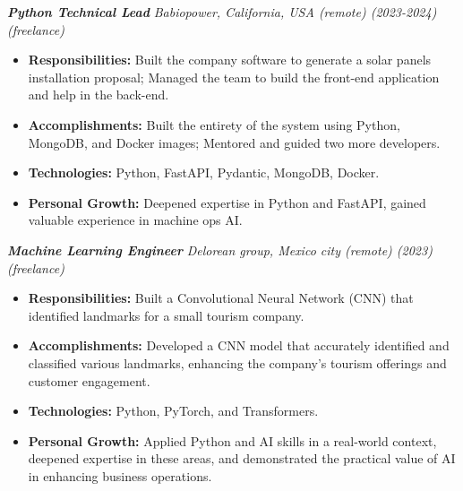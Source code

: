 \documentclass[a4paper,10pt]{article}
\begin{document}
\begin{minipage}[t]{0.65\textwidth}
\begin{minipage}[t]{\dimexpr\linewidth-25px}
    \vspace{0.5cm}

    \textbf{\textit{Python Technical Lead}}
    \textit{\small Babiopower, California, USA (remote) (2023-2024) (freelance)}
    \vspace{0.3cm}
    \begin{itemize}[leftmargin=*]
        \item \textbf{Responsibilities:} Built the company software to generate a solar panels installation proposal;
    Managed the team to build the front-end application and help in the back-end.
        \item \textbf{Accomplishments:} Built the entirety of the system using Python, MongoDB, and Docker images;
    Mentored and guided two more developers.
        \item \textbf{Technologies:} Python, FastAPI, Pydantic, MongoDB, Docker.
        \item \textbf{Personal Growth:} Deepened expertise in Python and FastAPI, gained valuable experience in machine ops AI.
    \end{itemize}

    \vspace{0.5cm}

    \textbf{\textit{Machine Learning Engineer}}
    \textit{\small Delorean group, Mexico city (remote) (2023) (freelance)}
    \vspace{0.3cm}
    \begin{itemize}[leftmargin=*]
        \item \textbf{Responsibilities:} Built a Convolutional Neural Network (CNN) that identified landmarks for a small
    tourism company.
        \item \textbf{Accomplishments:} Developed a CNN model that accurately identified and classified various
    landmarks, enhancing the company's tourism offerings and customer engagement.
        \item \textbf{Technologies:} Python, PyTorch, and Transformers.
        \item \textbf{Personal Growth:} Applied Python and AI skills in a real-world context, deepened expertise in these
    areas, and demonstrated the practical value of AI in enhancing business operations.
    \end{itemize}

    \vspace{0.5cm}


\end{minipage}
\end{minipage}
\end{document}
